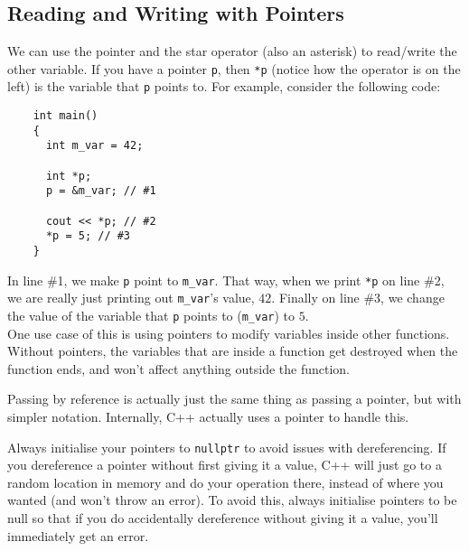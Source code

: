 \documentclass[class=article, crop=false]{standalone}
\begin{document}
  \subsection{Reading and Writing with Pointers}
  We can use the pointer and the star operator (also an asterisk) to read/write the other variable. If you have a pointer \texttt{p}, then \texttt{*p} (notice how the operator is on the left) is the variable that \texttt{p} points to. For example, consider the following code:
  \begin{lstlisting}
    int main()
    {
      int m_var = 42;

      int *p;
      p = &m_var; // #1

      cout << *p; // #2
      *p = 5; // #3
    }
  \end{lstlisting}
  In line \#1, we make \texttt{p} point to \texttt{m\_var}. That way, when we print \texttt{*p} on line \#2, we are really just printing out \texttt{m\_var}'s value, $42$. Finally on line \#3, we change the value of the variable that \texttt{p} points to (\texttt{m\_var}) to $5$. \\[10pt]
  One use case of this is using pointers to modify variables inside other functions. Without pointers, the variables that are inside a function get destroyed when the function ends, and won't affect anything outside the function.
  \begin{note}{}
    Passing by reference is actually just the same thing as passing a pointer, but with simpler notation. Internally, C++ actually uses a pointer to handle this.
  \end{note}
  Always initialise your pointers to \texttt{nullptr} to avoid issues with dereferencing. If you dereference a pointer without first giving it a value, C++ will just go to a random location in memory and do your operation there, instead of where you wanted (and won't throw an error). To avoid this, always initialise pointers to be null so that if you do accidentally dereference without giving it a value, you'll immediately get an error.
\end{document}
